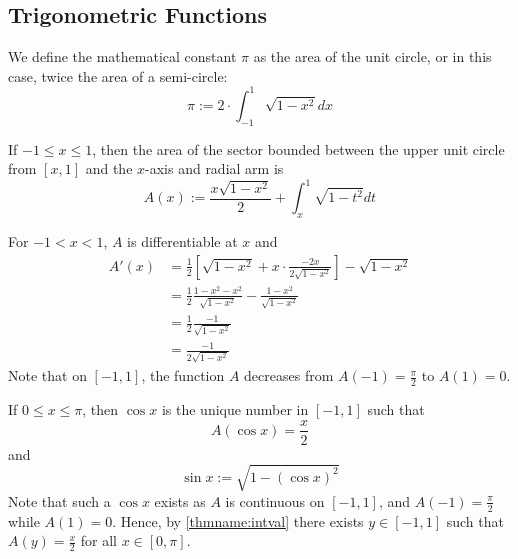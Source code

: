 \begin{subappendices}
    \section{Trigonometric Functions}

    \begin{defn}
        We define the mathematical constant $\pi$ as the area of the unit circle, or in this case, twice the area of a semi-circle:\begin{equation}
            \pi:=2\cdot \int_{-1}^1\sqrt{1-x^2}dx
        \end{equation}
    \end{defn}


    \begin{defn}
        If $-1 \leq x \leq 1$, then the area of the sector bounded between the upper unit circle from $[x,1]$ and the $x$-axis and radial arm is \begin{equation}
            A(x) := \frac{x\sqrt{1-x^2}}{2} + \int_x^1\sqrt{1-t^2}dt
        \end{equation}
    \end{defn}

    \begin{rmk}
        For $-1 < x < 1$, $A$ is differentiable at $x$ and \begin{align*}
            A'(x) &= \frac{1}{2}\left[\sqrt{1-x^2} +x\cdot\frac{-2x}{2\sqrt{1-x^2}}\right] -\sqrt{1-x^2} \\
            &= \frac{1}{2}\frac{1-x^2-x^2}{\sqrt{1-x^2}} - \frac{1-x^2}{\sqrt{1-x^2}} \\
            &= \frac{1}{2}\frac{-1}{\sqrt{1-x^2}} \\
            &= \frac{-1}{2\sqrt{1-x^2}}
        \end{align*}
        Note that on $[-1,1]$, the function $A$ decreases from $A(-1) = \frac{\pi}{2}$ to $A(1) = 0$.
    \end{rmk}

    \begin{defn}
        If $0 \leq x \leq \pi$, then $\cos x$ is the unique number in $[-1,1]$ such that \begin{equation}
            A(\cos x) = \frac{x}{2}
        \end{equation}
        and \begin{equation}
            \sin x := \sqrt{1-(\cos x)^2}
        \end{equation}
        Note that such a $\cos x$ exists as $A$ is continuous on $[-1,1]$, and $A(-1) = \frac{\pi}{2}$ while $A(1) = 0$. Hence, by \ref{thmname:intval} there exists $y \in [-1,1]$ such that $A(y) = \frac{x}{2}$ for all $x \in [0,\pi]$.
    \end{defn}



\end{subappendices}

